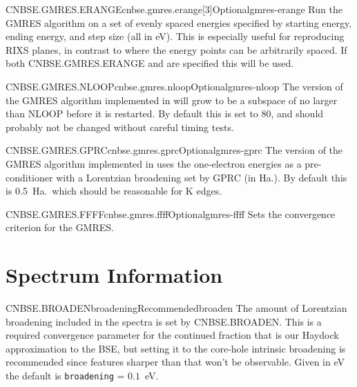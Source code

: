 \documentclass[11pt]{report}
\begin{document}
\begin{Card}{CNBSE.GMRES.ERANGE}{cnbse.gmres.erange[3]}{Optional}{gmres-erange}
Run the GMRES algorithm on a set of evenly spaced energies specified by starting energy, ending energy, and step size (all in eV). 
This is especially useful for reproducing RIXS planes, in contrast to   where the energy points can be arbitrarily spaced.
If both CNBSE.GMRES.ERANGE and  are specified this will be used.
\end{Card}

\begin{Card}{CNBSE.GMRES.NLOOP}{cnbse.gmres.nloop}{Optional}{gmres-nloop}
The version of the GMRES algorithm implemented in  will grow to be a subspace of no larger than NLOOP before it is restarted. By default this is set to 80, and should probably not be changed without careful timing tests.
\end{Card}

\begin{Card}{CNBSE.GMRES.GPRC}{cnbse.gmres.gprc}{Optional}{gmres-gprc}
The version of the GMRES algorithm implemented in  uses the one-electron energies as a pre-conditioner with a Lorentzian broadening set by GPRC (in Ha.). By default this is 0.5~Ha.\ which should be reasonable for K edges.
 \end{Card}

\begin{Card}{CNBSE.GMRES.FFFF}{cnbse.gmres.ffff}{Optional}{gmres-ffff}
Sets the convergence criterion for the GMRES.
\end{Card}


\section{Spectrum Information}
\label{sec:Spectrum-Information}
\begin{Card}{CNBSE.BROADEN}{broadening}{Recommended}{broaden}
The amount of Lorentzian broadening included in the spectra is set by CNBSE.BROADEN. This is a required convergence parameter for the continued fraction that is our Haydock approximation to the BSE, but setting it to the core-hole intrinsic broadening is recommended since features sharper than that won't be observable. Given in eV the default is \texttt{broadening} = $0.1$~eV.
\end{Card}
\end{document}
